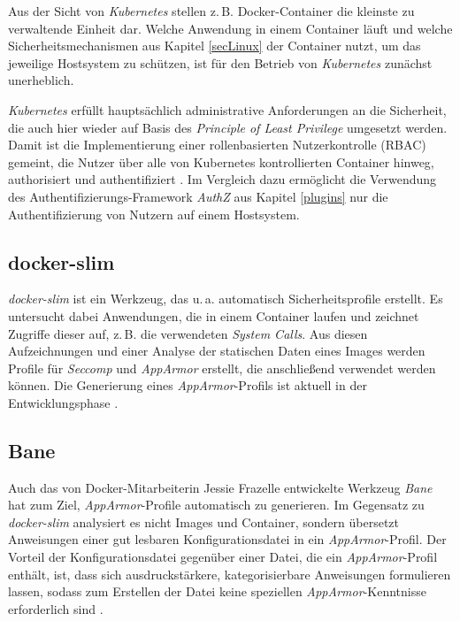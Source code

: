 \documentclass[../main.tex]{subfiles}
\begin{document}
      Aus der Sicht von \emph{Kubernetes} stellen z.\,B. Docker-Container die kleinste zu verwaltende Einheit dar. Welche Anwendung in einem Container läuft und welche Sicherheitsmechanismen aus Kapitel \ref{secLinux} der Container nutzt, um das jeweilige Hostsystem zu schützen, ist für den Betrieb von \emph{Kubernetes} zunächst unerheblich.

      \emph{Kubernetes} erfüllt hauptsächlich administrative Anforderungen an die Sicherheit, die auch hier wieder auf Basis des \emph{Principle of Least Privilege} umgesetzt werden. Damit ist die Implementierung einer rollenbasierten Nutzerkontrolle (\acrshort{RBAC}) gemeint, die Nutzer über alle von Kubernetes kontrollierten Container hinweg, authorisiert und authentifiziert \cite{githubKubernetesSecurity}. Im Vergleich dazu ermöglicht die Verwendung des Authentifizierungs-Framework \emph{AuthZ} aus Kapitel \ref{plugins} nur die Authentifizierung von Nutzern auf einem Hostsystem.



    \subsection{docker-slim}
      \emph{docker-slim} ist ein Werkzeug, das u.\,a. automatisch Sicherheitsprofile erstellt. Es untersucht dabei Anwendungen, die in einem Container laufen und zeichnet Zugriffe dieser auf, z.\,B. die verwendeten \emph{System Calls}. Aus diesen Aufzeichnungen und einer Analyse der statischen Daten eines Images werden Profile für \emph{Seccomp} und \emph{AppArmor} erstellt, die anschließend verwendet werden können. Die Generierung eines \emph{AppArmor}-Profils ist aktuell in der Entwicklungsphase \cite{githubDockerSlim}.

    \subsection{Bane}
      Auch das von Docker-Mitarbeiterin Jessie Frazelle entwickelte Werkzeug \emph{Bane} hat zum Ziel, \emph{AppArmor}-Profile automatisch zu generieren. Im Gegensatz zu \emph{docker-slim} analysiert es nicht Images und Container, sondern übersetzt Anweisungen einer gut lesbaren Konfigurationsdatei in ein \emph{AppArmor}-Profil. Der Vorteil der Konfigurationsdatei gegenüber einer Datei, die ein \emph{AppArmor}-Profil enthält, ist, dass sich ausdruckstärkere, kategorisierbare Anweisungen formulieren lassen, sodass zum Erstellen der Datei keine speziellen \emph{AppArmor}-Kenntnisse erforderlich sind \cite{githubBane}.
\end{document}
